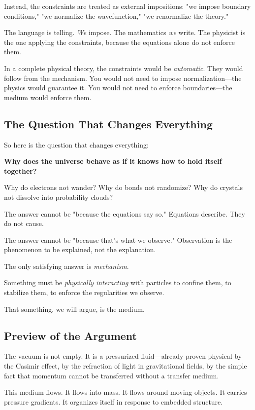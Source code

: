 \documentclass[12pt, a4paper]{article}
\begin{document}
Instead, the constraints are treated as external impositions: "we impose boundary conditions," "we normalize the wavefunction," "we renormalize the theory."

The language is telling. \textit{We} impose. The mathematics \textit{we} write. The physicist is the one applying the constraints, because the equations alone do not enforce them.

In a complete physical theory, the constraints would be \textit{automatic}. They would follow from the mechanism. You would not need to impose normalization—the physics would guarantee it. You would not need to enforce boundaries—the medium would enforce them.

\subsection{The Question That Changes Everything}

So here is the question that changes everything:

\textbf{Why does the universe behave as if it knows how to hold itself together?}

Why do electrons not wander? Why do bonds not randomize? Why do crystals not dissolve into probability clouds?

The answer cannot be "because the equations say so." Equations describe. They do not cause.

The answer cannot be "because that's what we observe." Observation is the phenomenon to be explained, not the explanation.

The only satisfying answer is \textit{mechanism}.

Something must be \textit{physically interacting} with particles to confine them, to stabilize them, to enforce the regularities we observe.

That something, we will argue, is the medium.

\subsection{Preview of the Argument}

The vacuum is not empty. It is a pressurized fluid—already proven physical by the Casimir effect, by the refraction of light in gravitational fields, by the simple fact that momentum cannot be transferred without a transfer medium.

This medium flows. It flows into mass. It flows around moving objects. It carries pressure gradients. It organizes itself in response to embedded structure.
\end{document}
